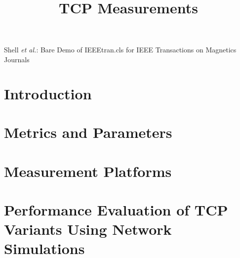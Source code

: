 \documentclass[journal,transmag]{IEEEtran}
\begin{document}
\title{TCP Measurements}

\author{
}

%
{Shell \MakeLowercase{\textit{et al.}}: Bare Demo of IEEEtran.cls for IEEE Transactions on Magnetics Journals}



\maketitle
\IEEEdisplaynontitleabstractindextext
\IEEEpeerreviewmaketitle

\section{Introduction}


\section{Metrics and Parameters}


\section{Measurement Platforms}


\section{Performance Evaluation of TCP Variants Using Network Simulations}



\end{document}

